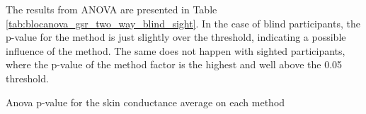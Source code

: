 The results from ANOVA are presented in Table \ref{tab:blocanova_gsr_two_way_blind_sight}. In the case of blind participants, the p-value for the method is just slightly over the threshold, indicating a possible influence of the method. The same does not happen with sighted participants, where the p-value of the method factor is the highest and well above the 0.05 threshold.
 
%
%

\begin{table}[!htb]
    \caption{Anova p-value for the skin conductance average on each method}
    \label{tab:blocanova_gsr_two_way_blind_sight}
\begin{minipage}{0.45\linewidth}
    
\end{minipage}%
\begin{minipage}{0.05\linewidth}
    \hfill
\end{minipage}%
\begin{minipage}{0.45\linewidth}
    
\end{minipage}
\end{table}

%
